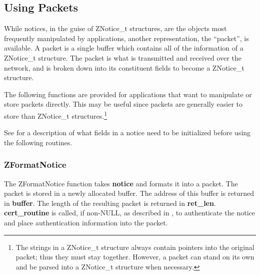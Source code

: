%
\subsection{Using Packets}
\label{using-packets}

While notices, in the guise of ZNotice_t structures, are the objects
most frequently manipulated by applications, another representation,
the ``packet'', is available.  A packet is a single buffer which
contains all of the information of a ZNotice_t structure.  The packet
is what is transmitted and received over the network, and is
broken down into its constituent fields to become a ZNotice_t
structure.

The following functions are provided for applications that want to
manipulate or store packets directly.  This may be useful since
packets are generally easier to store than ZNotice_t structures.\footnote{The
strings in a ZNotice_t structure always contain pointers into the
original packet; thus they must stay together.  However, a packet can
stand on its own and be parsed into a ZNotice_t structure when
necessary.}

See  for a description of what fields in a notice
need to be initialized before using the following routines.

\subsubsection{ZFormatNotice}
\label{ZFormatNotice}

\etemplate
{}

The ZFormatNotice function takes {\bf notice} and formats it into a
packet.  The packet is stored in a newly allocated buffer.  The address of
this buffer is returned in {\bf *buffer}.  The length of the resulting
packet is returned in {\bf *ret_len}.  {\bf cert_routine} is called, if
non-NULL, as described in , to authenticate
the notice and place authentication information into the packet.

